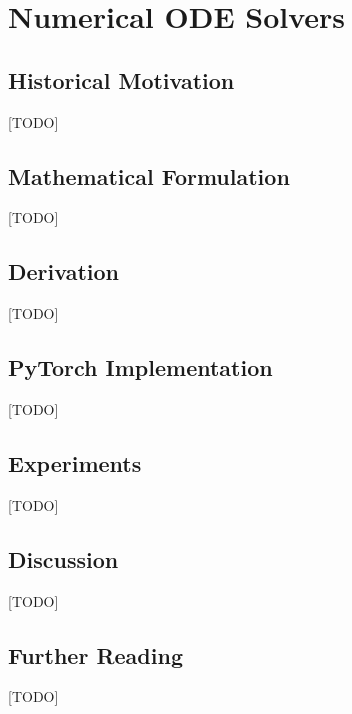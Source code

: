 
\chapter{Numerical ODE Solvers}
\label{ch:03_numerical_ode}


\section{Historical Motivation}
[TODO]

\section{Mathematical Formulation}
[TODO]

\section{Derivation}
[TODO]

\section{PyTorch Implementation}
[TODO]

\section{Experiments}
[TODO]

\section{Discussion}
[TODO]

\section{Further Reading}
[TODO]
